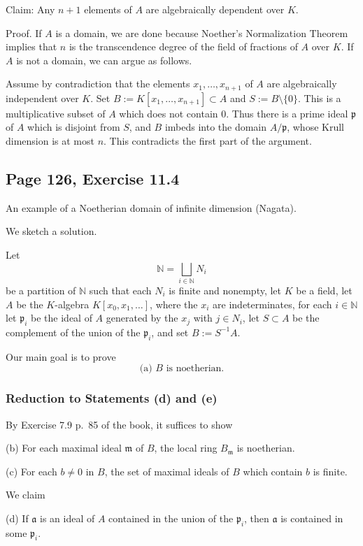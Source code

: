\documentclass[parskip=half,fontsize=12pt]{scrartcl}%
\newcommand{\mf}{\mathfrak}
\newcommand{\aaa}{\mf a}
\newcommand{\mmm}{\mf m}
\newcommand{\ppp}{\mf p}
\begin{document}
Claim: Any $n+1$ elements of $A$ are algebraically dependent over $K$.

Proof. If $A$ is a domain, we are done because Noether's Normalization Theorem implies that $n$ is the transcendence degree of the field of fractions of $A$ over $K$. If $A$ is not a domain, we can argue as follows. 

Assume by contradiction that the elements $x_1,\ldots,x_{n+1}$ of $A$ are algebraically independent over $K$. Set $B:=K[x_1,\ldots,x_{n+1}]\subset A$ and $S:=B\setminus\{0\}$. This is a multiplicative subset of $A$ which does not contain $0$. Thus there is a prime ideal $\ppp$ of $A$ which is disjoint from $S$, and $B$ imbeds into the domain $A/\ppp$, whose Krull dimension is at most $n$. This contradicts the first part of the argument. 

\subsection{Page 126, Exercise 11.4}%

An example of a Noetherian domain of infinite dimension (Nagata).

We sketch a solution. 

Let 
$$
\mathbb N=\bigsqcup_{i\in\mathbb N}N_i
$$ 
be a partition of $\mathbb N$ such that each $N_i$ is finite and nonempty, let $K$ be a field, let $A$ be the $K$-algebra $K[x_0,x_1,\dots]$, where the $x_i$ are indeterminates, for each $i\in\mathbb N$ let $\ppp_i$ be the ideal of $A$ generated by the $x_j$ with $j\in N_i$, let $S\subset A$ be the complement of the union of the $\ppp_i$, and set $B:=S^{-1}A$. 

Our main goal is to prove 
$$
\text{(a) $B$ is noetherian.} 
$$ 
\subsubsection{Reduction to Statements (d) and (e)}

By Exercise 7.9 p.~85 of the book, it suffices to show 

(b) For each maximal ideal $\mmm$ of $B$, the local ring $B_\mmm$ is noetherian.

(c) For each $b\ne0$ in $B$, the set of maximal ideals of $B$ which contain $b$ is
finite.

We claim 

(d) If $\aaa$ is an ideal of $A$ contained in the union of the $\ppp_i$, then $\aaa$ is contained in some $\ppp_i$. %
\end{document}
